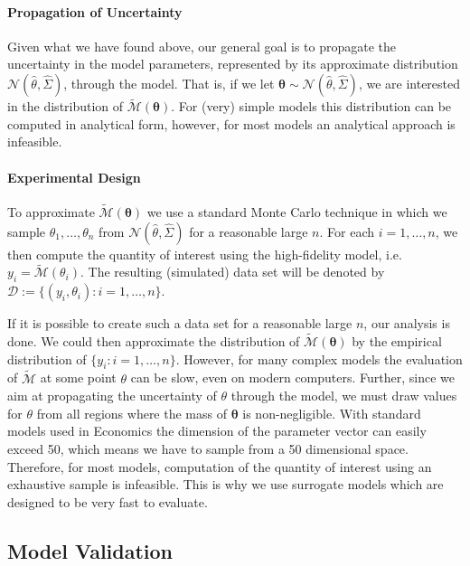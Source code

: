 \documentclass[a4paper, 12pt]{article}
\begin{document}
\paragraph{Propagation of Uncertainty}

Given what we have found above, our general goal is to propagate the uncertainty in the model parameters, represented by its approximate distribution $\mathcal{N}(\hat{\theta}, \hat{\Sigma})$, through the model.
That is, if we let $\bm{\theta} \sim \mathcal{N}(\hat{\theta}, \hat{\Sigma})$, we are interested in the distribution of $\tilde{\mathcal{M}}(\bm{\theta})$.
For (very) simple models this distribution can be computed in analytical form, however, for most models an analytical approach is infeasible.

\paragraph{Experimental Design}

To approximate $\tilde{\mathcal{M}}(\bm{\theta})$ we use a standard Monte Carlo technique in which we sample $\theta_1,\dots,\theta_n$ from $\mathcal{N}(\hat{\theta}, \hat{\Sigma})$ for a reasonable large $n$.
For each $i = 1,\dots, n$, we then compute the quantity of interest using the high-fidelity model, i.e. $y_i = \tilde{\mathcal{M}}(\theta_i)$.
The resulting (simulated) data set will be denoted by $\mathcal{D} := \{(y_i, \theta_i) : i=1,\dots, n\}$.

If it is possible to create such a data set for a reasonable large $n$, our analysis is done.
We could then approximate the distribution of $\tilde{\mathcal{M}}(\bm{\theta})$ by the empirical distribution of $\{y_i : i = 1,\dots,n\}$.
However, for many complex models the evaluation of $\tilde{\mathcal{M}}$ at some point $\theta$ can be slow, even on modern computers.
Further, since we aim at propagating the uncertainty of $\theta$ through the model, we must draw values for $\theta$ from all regions where the mass of $\bm{\theta}$ is non-negligible.
With standard models used in Economics the dimension of the parameter vector can easily exceed 50, which means we have to sample from a 50 dimensional space. Therefore, for most models, computation of the quantity of interest using an exhaustive sample is infeasible. This is why we use surrogate models which are designed to be very fast to evaluate.

\subsection{Model Validation}%
\end{document}
